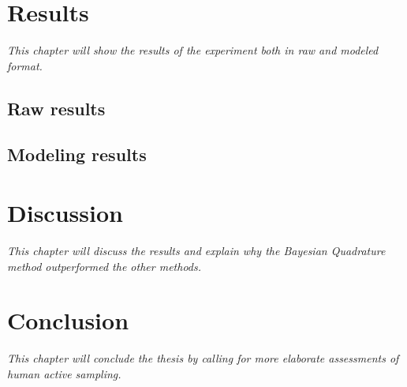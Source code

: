 \documentclass[oneside, 11pt]{book}
\begin{document}
\chapter{Results}
\emph{This chapter will show the results of the experiment both in raw and modeled format.}
\section{Raw results}
\section{Modeling results}
\chapter{Discussion}
\emph{This chapter will discuss the results and explain why the Bayesian Quadrature method outperformed the other methods.}

\chapter{Conclusion}
\emph{This chapter will conclude the thesis by calling for more elaborate assessments of human active sampling.}


{\footnotesize}


\end{document}
